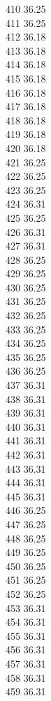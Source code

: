 410	36.25\\
411	36.25\\
412	36.18\\
413	36.18\\
414	36.18\\
415	36.18\\
416	36.18\\
417	36.18\\
418	36.18\\
419	36.18\\
420	36.18\\
421	36.25\\
422	36.25\\
423	36.25\\
424	36.31\\
425	36.25\\
426	36.31\\
427	36.31\\
428	36.25\\
429	36.25\\
430	36.25\\
431	36.25\\
432	36.25\\
433	36.25\\
434	36.25\\
435	36.25\\
436	36.25\\
437	36.31\\
438	36.31\\
439	36.31\\
440	36.31\\
441	36.31\\
442	36.31\\
443	36.31\\
444	36.31\\
445	36.31\\
446	36.25\\
447	36.25\\
448	36.25\\
449	36.25\\
450	36.25\\
451	36.25\\
452	36.25\\
453	36.31\\
454	36.31\\
455	36.31\\
456	36.31\\
457	36.31\\
458	36.31\\
459	36.31\\
